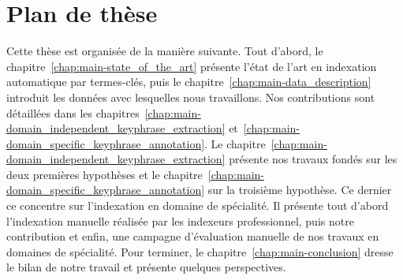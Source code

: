 
  \section{Plan de thèse}
  \label{sec:main-introduction-outline}
    Cette thèse est organisée de la manière suivante. Tout d'abord, le
    chapitre~\ref{chap:main-state_of_the_art} présente l'état de l'art en
    indexation automatique par termes-clés, puis le
    chapitre~\ref{chap:main-data_description} introduit les données avec
    lesquelles nous travaillons. Nos contributions sont détaillées dans les
    chapitres~\ref{chap:main-domain_independent_keyphrase_extraction}
    et~\ref{chap:main-domain_specific_keyphrase_annotation}. Le
    chapitre~\ref{chap:main-domain_independent_keyphrase_extraction} présente
    nos travaux fondés sur les deux premières hypothèses et le
    chapitre~\ref{chap:main-domain_specific_keyphrase_annotation} sur la
    troisième hypothèse. Ce dernier ce concentre sur l'indexation en domaine de
    spécialité. Il présente tout d'abord l'indexation manuelle réalisée par les
    indexeurs professionnel, puis notre contribution et enfin, une campagne
    d'évaluation manuelle de nos travaux en domaines de spécialité. Pour
    terminer, le chapitre~\ref{chap:main-conclusion} dresse le bilan de notre
    travail et présente quelques perspectives.


